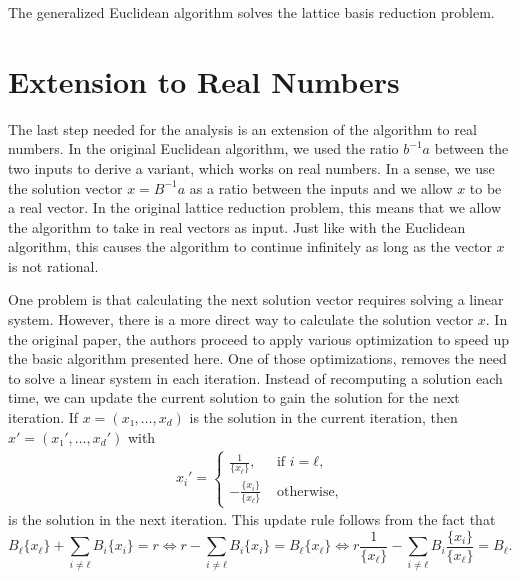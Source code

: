 \begin{theorem}
  The generalized Euclidean algorithm solves the lattice basis reduction problem.
\end{theorem}

\section{Extension to Real Numbers}

The last step needed for the analysis is an extension of the algorithm to real
numbers.
In the original Euclidean algorithm,
we used the ratio $b^{-1}a$ between the two inputs to derive a variant,
which works on real numbers.
In a sense, we use the solution vector $x = B^{-1}a$ as a ratio between the inputs
and we allow $x$ to be a real vector.
In the original lattice reduction problem, this means that we allow the
algorithm to take in real vectors as input.
Just like with the Euclidean algorithm, this causes the algorithm to continue
infinitely as long as the vector $x$ is not rational.

One problem is that calculating the next solution vector requires solving a
linear system.
However, there is a more direct way to calculate the solution vector $x$.
In the original paper, the authors proceed to apply various optimization
to speed up the basic algorithm presented here.
One of those optimizations, removes the need to solve a linear system in each iteration.
Instead of recomputing a solution each time,
we can update the current solution to gain the solution for the next iteration.
If $x = (x₁, …, x_d)$ is the solution in the current iteration,
then $x' = (x₁', …, x_d')$ with
\begin{align*}
  x_i' =
  \begin{cases}
    \frac{1}{\{x_ℓ\}},  & \text{ if } i = ℓ, \\
    -\frac{\{x_i\}}{\{x_ℓ\}} & \text{ otherwise,}
  \end{cases}
\end{align*}
is the solution in the next iteration.
This update rule follows from the fact that
\[
  B_ℓ \{x_ℓ\} + \sum_{i ≠ ℓ} B_i \{x_i\} = r
  \iff
  r - \sum_{i ≠ ℓ} B_i \{x_i\} = B_ℓ \{x_ℓ\}
  \iff
  r \frac{1}{\{x_ℓ\}} - \sum_{i ≠ ℓ} B_i \frac{\{x_i\}}{\{x_ℓ\}} = B_ℓ.
\]

